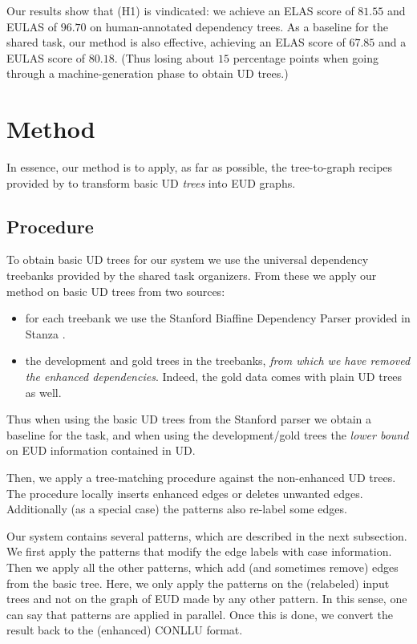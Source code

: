 \documentclass[11pt,a4paper]{article}
\begin{document}
Our results show that (H1) is vindicated: we achieve an ELAS score
of $81.55$ and EULAS of $96.70$ on human-annotated dependency
trees.  As a baseline for the shared task, our method is also
effective, achieving an ELAS score of $67.85$ and a EULAS score
of $80.18$. (Thus losing about $15$ percentage points when going
through a machine-generation phase to obtain UD trees.)

\section{Method}
In essence, our method is to apply, as far as possible, the
tree-to-graph recipes provided by \citet{schuster2016enhanced} to
transform basic UD \emph{trees} into EUD graphs.

\subsection{Procedure} 
To obtain basic UD trees for our system we use the universal
dependency treebanks provided by the shared task organizers. From
these we apply our method on basic UD trees from two sources:

\begin{itemize}
\item for each treebank we use the Stanford Biaffine Dependency
      Parser \citep{dozat2016deep} provided in Stanza
\citep{qi2020stanza}.
\item the development and gold trees in the treebanks, \emph{from
      which we have removed the enhanced dependencies}. Indeed, the gold
      data comes with plain UD trees as well.
\end{itemize}

Thus when using the basic UD trees from the Stanford parser we obtain a
baseline for the task, and when using the development/gold trees the
\emph{lower bound} on EUD information contained in UD.

%
Then, we apply a tree-matching procedure against the non-enhanced UD
trees. The procedure locally inserts enhanced edges or deletes unwanted
edges. Additionally (as a special case) the patterns also re-label some edges.


Our system contains several patterns, which are described in the next
subsection. We first apply the patterns that modify
the edge labels with case information. Then we apply all the other
patterns, which add (and sometimes remove) edges from the basic
tree. Here, we only apply the patterns on the (relabeled) input trees
and not on the graph of EUD made by any other pattern. In this sense,
one can say that patterns are applied in parallel.
%
Once this is done, we convert the result back to the
(enhanced) CONLLU format.
\end{document}
